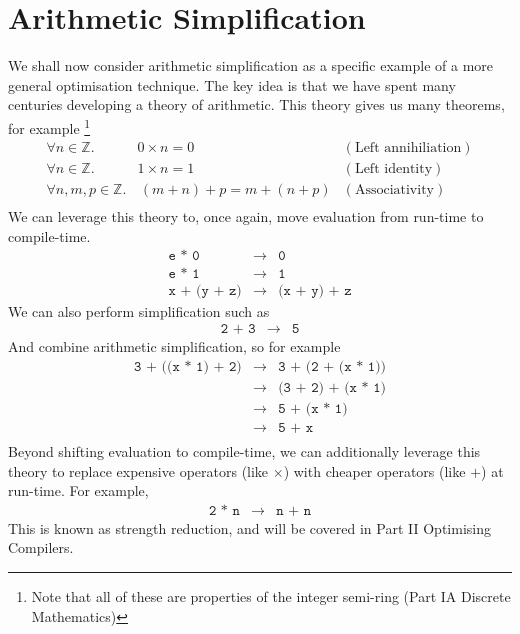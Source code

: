 \section{Arithmetic Simplification}
We shall now consider arithmetic simplification as a specific example of a more general optimisation technique. The key idea is that we have spent many centuries developing a theory of arithmetic. This theory gives us many theorems, for example \footnote{Note that all of these are properties of the integer semi-ring (\textsf{Part IA Discrete Mathematics})}
\[\begin{array}{llr}
    \forall n \in \mathbb{Z}. \, & 0 \times n = 0 & (\text{Left annihiliation}) \\
    \forall n \in \mathbb{Z}. \, & 1 \times n = 1 & (\text{Left identity}) \\
     \forall n, m, p \in \mathbb{Z}. & \, (m + n) + p = m + (n + p) & (\text{Associativity}) \\
\end{array}\]
We can leverage this theory to, once again, move evaluation from run-time to compile-time. 
\[\begin{array}{rcl}
    \texttt{e * 0} & \to & \texttt{0} \\
    \texttt{e * 1} & \to & \texttt{1} \\
    \texttt{x + (y + z)} & \to & \texttt{(x + y) + z}
\end{array}\]
We can also perform simplification such as
\[\begin{array}{rcl}
    \texttt{2 + 3} & \to & \texttt{5}
\end{array}\]
And combine arithmetic simplification, so for example
\[\begin{array}{rcl}
    \texttt{3 + ((x * 1) + 2)} & \to & \texttt{3 + (2 + (x * 1))} \\
                               & \to & \texttt{(3 + 2) + (x * 1)}\\
                               & \to & \texttt{5 + (x * 1)}\\
                               & \to & \texttt{5 + x}\\
\end{array}\]
Beyond shifting evaluation to compile-time, we can additionally leverage this theory to replace expensive operators (like $\times$) with cheaper operators (like $+$) at run-time. For example,
\[\begin{array}{rcl}
    \texttt{2 * n} & \to & \texttt{n + n}
\end{array}\]
This is known as strength reduction, and will be covered in \textsf{Part II Optimising Compilers}. 

